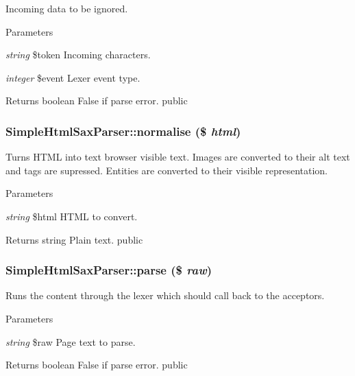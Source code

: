 \label{class_simple_html_sax_parser_a2f1f52f6ef26043cb8bef7ab0e62dc7c}
Incoming data to be ignored. 
\begin{DoxyParams}{Parameters}
\item[{\em string}]\$token Incoming characters. \item[{\em integer}]\$event Lexer event type. \end{DoxyParams}
\begin{DoxyReturn}{Returns}
boolean False if parse error.  public 
\end{DoxyReturn}
\hypertarget{class_simple_html_sax_parser_a54592509563906bedbd10520269d3ec9}{
\subsubsection[{normalise}]{\setlength{\rightskip}{0pt plus 5cm}SimpleHtmlSaxParser::normalise (\$ {\em html})}}
\label{class_simple_html_sax_parser_a54592509563906bedbd10520269d3ec9}
Turns HTML into text browser visible text. Images are converted to their alt text and tags are supressed. Entities are converted to their visible representation. 
\begin{DoxyParams}{Parameters}
\item[{\em string}]\$html HTML to convert. \end{DoxyParams}
\begin{DoxyReturn}{Returns}
string Plain text.  public 
\end{DoxyReturn}
\hypertarget{class_simple_html_sax_parser_a2f2715ca4673bae15a7c8a53d253a083}{
\subsubsection[{parse}]{\setlength{\rightskip}{0pt plus 5cm}SimpleHtmlSaxParser::parse (\$ {\em raw})}}
\label{class_simple_html_sax_parser_a2f2715ca4673bae15a7c8a53d253a083}
Runs the content through the lexer which should call back to the acceptors. 
\begin{DoxyParams}{Parameters}
\item[{\em string}]\$raw Page text to parse. \end{DoxyParams}
\begin{DoxyReturn}{Returns}
boolean False if parse error.  public 
\end{DoxyReturn}
